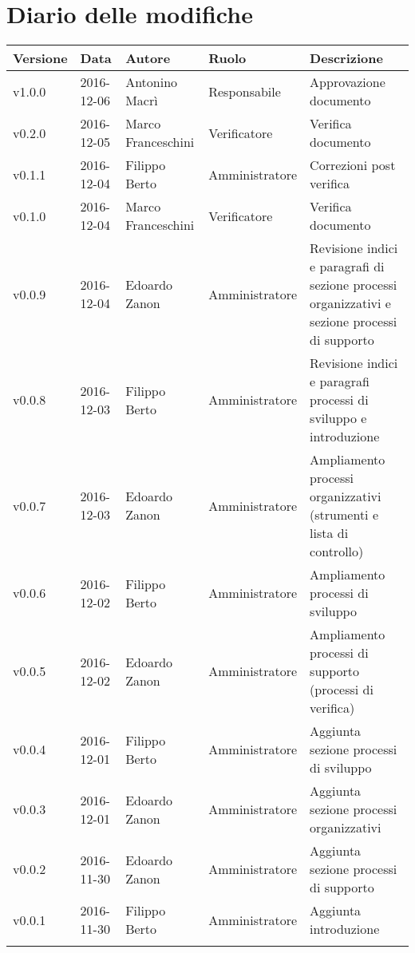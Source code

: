
	\section*{Diario delle modifiche}
\begin{longtabu} to \textwidth {
	X[3,c,m]
	X[4,c,m]
	X[4,c,m]
	X[5,c,m]
	X[10,c,m]}
	\toprule
	\textbf{Versione} & \textbf{Data}  & \textbf{Autore} & \textbf{Ruolo} & \textbf{Descrizione}\\
	\midrule
	\endhead

v1.0.0 & 2016-12-06 & Antonino Macrì & Responsabile & Approvazione documento \\
\addlinespace[0.4em]
\midrule
\addlinespace[0.4em]
v0.2.0 & 2016-12-05 & Marco Franceschini & Verificatore & Verifica documento \\
\addlinespace[0.4em]
\midrule
\addlinespace[0.4em]
v0.1.1 & 2016-12-04 & Filippo Berto & Amministratore & Correzioni post verifica \\
\addlinespace[0.4em]
\midrule
\addlinespace[0.4em]
v0.1.0 & 2016-12-04 & Marco Franceschini & Verificatore & Verifica documento \\
\addlinespace[0.4em]
\midrule
\addlinespace[0.4em]
v0.0.9 & 2016-12-04 & Edoardo Zanon & Amministratore & Revisione indici e paragrafi di sezione processi organizzativi e sezione processi di supporto \\
\addlinespace[0.4em]
\midrule
\addlinespace[0.4em]
v0.0.8 & 2016-12-03 & Filippo Berto & Amministratore & Revisione indici e paragrafi processi di sviluppo e introduzione \\
\addlinespace[0.4em]
\midrule
\addlinespace[0.4em]
v0.0.7 & 2016-12-03 & Edoardo Zanon & Amministratore & Ampliamento processi organizzativi (strumenti e lista di controllo) \\
\addlinespace[0.4em]
\midrule
\addlinespace[0.4em]
v0.0.6 & 2016-12-02 & Filippo Berto & Amministratore & Ampliamento processi di sviluppo \\
\addlinespace[0.4em]
\midrule
\addlinespace[0.4em]
v0.0.5 & 2016-12-02 & Edoardo Zanon & Amministratore & Ampliamento processi di supporto (processi di verifica) \\
\addlinespace[0.4em]
\midrule
\addlinespace[0.4em]
v0.0.4 & 2016-12-01 & Filippo Berto & Amministratore & Aggiunta sezione processi di sviluppo \\
\addlinespace[0.4em]
\midrule
\addlinespace[0.4em]
v0.0.3 & 2016-12-01 & Edoardo Zanon & Amministratore & Aggiunta sezione processi organizzativi \\
\addlinespace[0.4em]
\midrule
\addlinespace[0.4em]
v0.0.2 & 2016-11-30 & Edoardo Zanon & Amministratore & Aggiunta sezione processi di supporto \\
\addlinespace[0.4em]
\midrule
\addlinespace[0.4em]
v0.0.1 & 2016-11-30 & Filippo Berto & Amministratore & Aggiunta introduzione \\

	\addlinespace[0.5em]

	\bottomrule
\end{longtabu}
